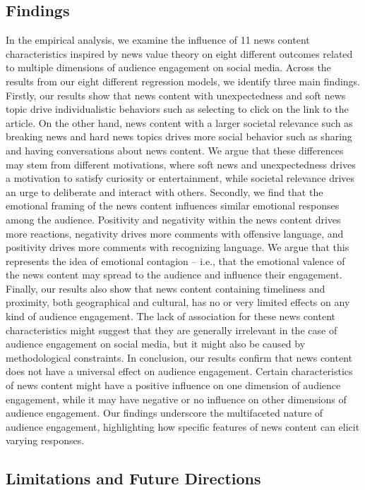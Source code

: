 \documentclass[
]{article}
\begin{document}
\hypertarget{findings}{%
\subsection{Findings}\label{findings}}

In the empirical analysis, we examine the influence of 11 news content
characteristics inspired by news value theory on eight different
outcomes related to multiple dimensions of audience engagement on social
media. Across the results from our eight different regression models, we
identify three main findings. Firstly, our results show that news
content with unexpectedness and soft news topic drive individualistic
behaviors such as selecting to click on the link to the article. On the
other hand, news content with a larger societal relevance such as
breaking news and hard news topics drives more social behavior such as
sharing and having conversations about news content. We argue that these
differences may stem from different motivations, where soft news and
unexpectedness drives a motivation to satisfy curiosity or
entertainment, while societal relevance drives an urge to deliberate and
interact with others. Secondly, we find that the emotional framing of
the news content influences similar emotional responses among the
audience. Positivity and negativity within the news content drives more
reactions, negativity drives more comments with offensive language, and
positivity drives more comments with recognizing language. We argue that
this represents the idea of emotional contagion -- i.e., that the
emotional valence of the news content may spread to the audience and
influence their engagement. Finally, our results also show that news
content containing timeliness and proximity, both geographical and
cultural, has no or very limited effects on any kind of audience
engagement. The lack of association for these news content
characteristics might suggest that they are generally irrelevant in the
case of audience engagement on social media, but it might also be caused
by methodological constraints. In conclusion, our results confirm that
news content does not have a universal effect on audience engagement.
Certain characteristics of news content might have a positive influence
on one dimension of audience engagement, while it may have negative or
no influence on other dimensions of audience engagement. Our findings
underscore the multifaceted nature of audience engagement, highlighting
how specific features of news content can elicit varying responses.

\hypertarget{limitations-and-future-directions}{%
\subsection{Limitations and Future
Directions}\label{limitations-and-future-directions}}
\end{document}
